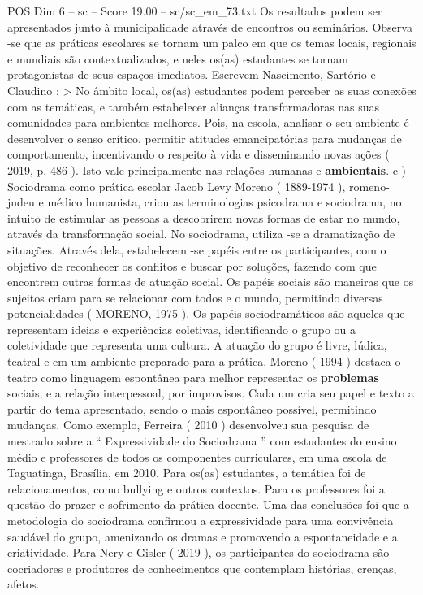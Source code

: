 \begin{textsample}{POS Dim 6 – sc – Score 19.00 – sc/sc\_em\_73.txt}
Os resultados podem ser apresentados junto à municipalidade através de encontros ou seminários.
Observa -se que as práticas escolares se tornam um palco em que os temas locais, regionais e mundiais são contextualizados, e neles os(as) estudantes se tornam protagonistas de seus espaços imediatos.
Escrevem Nascimento, Sartório e Claudino : > No âmbito local, os(as) estudantes podem perceber as suas conexões com as temáticas, e também estabelecer alianças transformadoras nas suas comunidades para ambientes melhores.
Pois, na escola, analisar o seu ambiente é desenvolver o senso crítico, permitir atitudes emancipatórias para mudanças de comportamento, incentivando o respeito à vida e disseminando novas ações ( 2019, p. 486 ).
Isto vale principalmente nas relações humanas e \textbf{ambientais}. c ) Sociodrama como prática escolar Jacob Levy Moreno ( 1889-1974 ), romeno-judeu e médico humanista, criou as terminologias psicodrama e sociodrama, no intuito de estimular as pessoas a descobrirem novas formas de estar no mundo, através da transformação social.
No sociodrama, utiliza -se a dramatização de situações.
Através dela, estabelecem -se papéis entre os participantes, com o objetivo de reconhecer os conflitos e buscar por soluções, fazendo com que encontrem outras formas de atuação social.
Os papéis sociais são maneiras que os sujeitos criam para se relacionar com todos e o mundo, permitindo diversas potencialidades ( MORENO, 1975 ).
Os papéis sociodramáticos são aqueles que representam ideias e experiências coletivas, identificando o grupo ou a coletividade que representa uma cultura.
A atuação do grupo é livre, lúdica, teatral e em um ambiente preparado para a prática.
Moreno ( 1994 ) destaca o teatro como linguagem espontânea para melhor representar os \textbf{problemas} sociais, e a relação interpessoal, por improvisos.
Cada um cria seu papel e texto a partir do tema apresentado, sendo o mais espontâneo possível, permitindo mudanças.
Como exemplo, Ferreira ( 2010 ) desenvolveu sua pesquisa de mestrado sobre a “ Expressividade do Sociodrama ” com estudantes do ensino médio e professores de todos os componentes curriculares, em uma escola de Taguatinga, Brasília, em 2010.
Para os(as) estudantes, a temática foi de relacionamentos, como bullying e outros contextos.
Para os professores foi a questão do prazer e sofrimento da prática docente.
Uma das conclusões foi que a metodologia do sociodrama confirmou a expressividade para uma convivência saudável do grupo, amenizando os dramas e promovendo a espontaneidade e a criatividade.
Para Nery e Gisler ( 2019 ), os participantes do sociodrama são cocriadores e produtores de conhecimentos que contemplam histórias, crenças, afetos.

\end{textsample}
